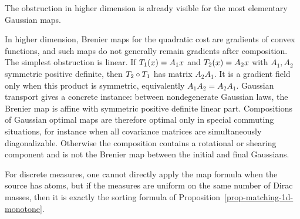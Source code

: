 The obstruction in higher dimension is already visible for the most elementary Gaussian maps.

\begin{example}
	In higher dimension, Brenier maps for the quadratic cost are gradients of convex functions, and such maps do not generally remain gradients after composition. The simplest obstruction is linear. If $T_1(x)=A_1x$ and $T_2(x)=A_2x$ with $A_1,A_2$ symmetric positive definite, then $T_2\circ T_1$ has matrix $A_2A_1$. It is a gradient field only when this product is symmetric, equivalently $A_1A_2=A_2A_1$. Gaussian transport gives a concrete instance: between nondegenerate Gaussian laws, the Brenier map is affine with symmetric positive definite linear part. Compositions of Gaussian optimal maps are therefore optimal only in special commuting situations, for instance when all covariance matrices are simultaneously diagonalizable. Otherwise the composition contains a rotational or shearing component and is not the Brenier map between the initial and final Gaussians.
\end{example}

For discrete measures, one cannot directly apply the map formula when the source has atoms, but if the measures are uniform on the same number of Dirac masses, then it is exactly the sorting formula of Proposition~\ref{prop-matching-1d-monotone}.


